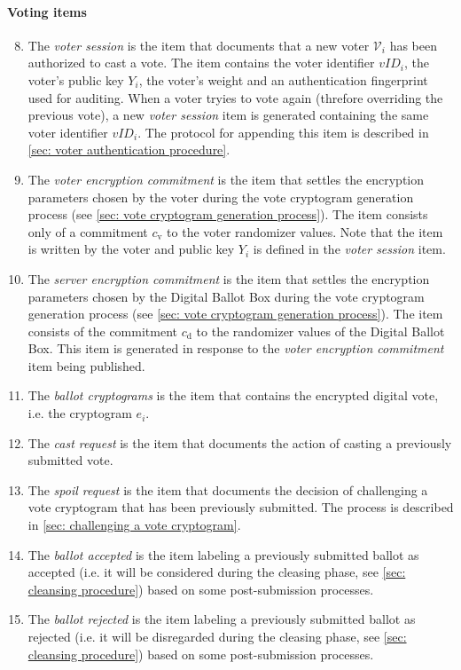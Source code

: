 \paragraph{Voting items}
\begin{enumerate}
    \setcounter{enumi}{7}
    \item The \textit{voter session} is the item that documents that a new voter $\mathcal{V}_i$ has been authorized to cast a vote. The item contains the voter identifier $vID_i$, the voter's public key $Y_i$, the voter's weight and an authentication fingerprint used for auditing. When a voter tryies to vote again (threfore overriding the previous vote), a new \textit{voter session} item is generated containing the same voter identifier $vID_i$. The protocol for appending this item is described in \cref{sec: voter authentication procedure}.

    \item The \textit{voter encryption commitment} is the item that settles the encryption parameters chosen by the voter during the vote cryptogram generation process (see \cref{sec: vote cryptogram generation process}). The item consists only of a commitment $c_\mathrm{v}$ to the voter randomizer values. Note that the item is written by the voter and public key $Y_i$ is defined in the \textit{voter session} item.
    
    \item The \textit{server encryption commitment} is the item that settles the encryption parameters chosen by the Digital Ballot Box during the vote cryptogram generation process (see \cref{sec: vote cryptogram generation process}). The item consists of the commitment $c_\mathrm{d}$ to the randomizer values of the Digital Ballot Box. This item is generated in response to the \textit{voter encryption commitment} item being published.
    
    \item The \textit{ballot cryptograms} is the item that contains the encrypted digital vote, i.e. the cryptogram $e_i$.
    
    \item The \textit{cast request} is the item that documents the action of casting a previously submitted vote.
    
    \item The \textit{spoil request} is the item that documents the decision of challenging a vote cryptogram that has been previously submitted. The process is described in \cref{sec: challenging a vote cryptogram}.
    
    \item The \textit{ballot accepted} is the item labeling a previously submitted ballot as accepted (i.e. it will be considered during the cleasing phase, see \cref{sec: cleansing procedure}) based on some post-submission processes.
    
    \item The \textit{ballot rejected} is the item labeling a previously submitted ballot as rejected (i.e. it will be disregarded during the cleasing phase, see \cref{sec: cleansing procedure}) based on some post-submission processes.
\end{enumerate}

